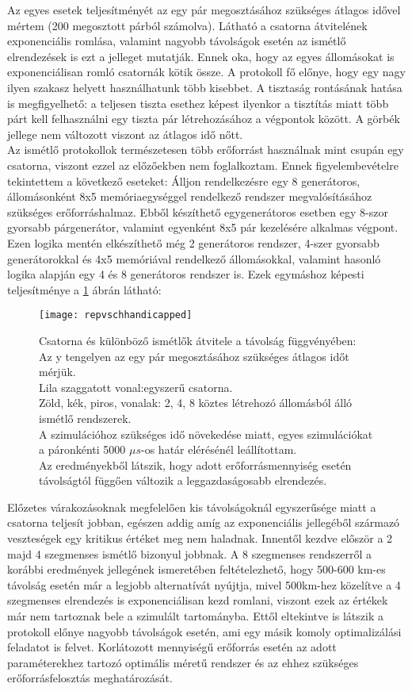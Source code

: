 Az egyes esetek teljesítményét az egy pár megosztásához szükséges átlagos idővel mértem (200 megosztott párból számolva).
Látható a csatorna átvitelének exponenciális romlása, valamint nagyobb távolságok esetén az ismétlő elrendezések is ezt a jelleget mutatják. Ennek oka, hogy az egyes állomásokat is exponenciálisan romló csatornák kötik össze. A protokoll fő előnye, hogy egy nagy ilyen szakasz helyett használhatunk több kisebbet. A tisztaság rontásának hatása is megfigyelhető: a teljesen tiszta esethez képest ilyenkor a tisztítás miatt több párt kell felhasználni egy tiszta pár létrehozásához a végpontok között. A görbék jellege nem változott viszont az átlagos idő nőtt.\\
Az ismétlő protokollok természetesen több erőforrást használnak mint csupán egy csatorna, viszont ezzel az előzőekben nem foglalkoztam. Ennek figyelembevételre tekintettem a következő eseteket: Álljon rendelkezésre egy 8 generátoros, állomásonként 8x5 memóriaegységgel rendelkező rendszer megvalósításához szükséges erőforráshalmaz. Ebből készíthető egygenerátoros esetben egy 8-szor gyorsabb párgenerátor, valamint egyenként 8x5 pár kezelésére alkalmas végpont. Ezen logika mentén elkészíthető még 2 generátoros rendszer, 4-szer gyorsabb generátorokkal és 4x5 memóriával rendelkező állomásokkal, valamint hasonló logika alapján egy 4 és 8 generátoros rendszer is. Ezek egymáshoz képesti teljesítménye a \ref{fig:csat3} ábrán látható:
\begin{figure}[H]
\centering
\texttt{[image: repvschhandicapped]}
\caption[Csatorna és ismétlők karakterisztikája 2]
{Csatorna és különböző ismétlők átvitele a távolság függvényében:\\
Az y tengelyen az egy pár megosztásához szükséges átlagos időt mérjük.\\
Lila szaggatott vonal:egyszerű csatorna.\\
Zöld, kék, piros, vonalak: 2, 4, 8 köztes létrehozó állomásból álló ismétlő rendszerek.\\
A szimulációhoz szükséges idő növekedése miatt, egyes szimulációkat a páronkénti 5000 $\mu s$-os határ elérésénél leállítottam.\\
Az eredményekből látszik, hogy adott erőforrásmennyiség esetén távolságtól függően változik a leggazdaságosabb elrendezés.
}
\label{fig:csat3}
\end{figure}
Előzetes várakozásoknak megfelelően kis távolságoknál egyszerűsége miatt a csatorna teljesít jobban, egészen addig amíg az exponenciális jellegéből származó  veszteségek egy kritikus értéket meg nem haladnak. Innentől kezdve először a 2 majd 4 szegmenses ismétlő bizonyul jobbnak. A 8 szegmenses rendszerről a korábbi eredmények jellegének ismeretében feltételezhető, hogy 500-600 km-es távolság esetén már a legjobb alternatívát nyújtja, mivel 500km-hez közelítve a 4 szegmenses elrendezés is exponenciálisan kezd romlani, viszont ezek az értékek már nem tartoznak bele a szimulált tartományba. Ettől eltekintve is látszik a protokoll előnye nagyobb távolságok esetén, ami egy másik komoly optimalizálási feladatot is felvet. Korlátozott mennyiségű erőforrás esetén az adott paraméterekhez tartozó optimális méretű rendszer és az ehhez szükséges erőforrásfelosztás meghatározását.

